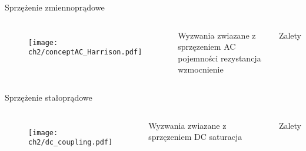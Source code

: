 \begin{frame}{Sprzężenie zmiennoprądowe}
    \begin{columns}

    \begin{figure}[H]
        \centering
        \texttt{[image: ch2/conceptAC\_Harrison.pdf]} 
    \end{figure}
    \begin{alertblock}{Wyzwania zwiazane z sprzęzeniem AC}
pojemności rezystancja wzmocnienie
    \end{alertblock}
    \begin{exampleblock}{Zalety}

    \end{exampleblock}
\end{columns}

\end{frame}



\begin{frame}{Sprzężenie stałoprądowe}
    \begin{columns}
        \begin{figure}[H]
            \centering
            \texttt{[image: ch2/dc\_coupling.pdf]}
        \end{figure}

    \begin{alertblock}{Wyzwania zwiazane z sprzęzeniem DC}
saturacja
    \end{alertblock}
    \begin{exampleblock}{Zalety}

    \end{exampleblock}
\end{columns}

\end{frame}


